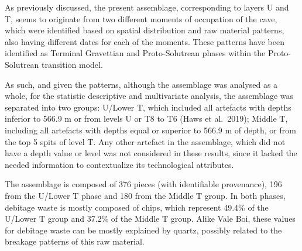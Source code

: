 \documentclass[12pt,twoside]{reedthesis}
\begin{document}
As previously discussed, the present assemblage, corresponding to layers U and T, seems to originate from two different moments of occupation of the cave, which were identified based on spatial distribution and raw material patterns, also having different dates for each of the moments. These patterns have been identified as Terminal Gravettian and Proto-Solutrean phases within the Proto-Solutrean transition model.

As such, and given the patterns, although the assemblage was analysed as a whole, for the statistic descriptive and multivariate analysis, the assemblage was separated into two groups: U/Lower T, which included all artefacts with depths inferior to 566.9 m or from levels U or T8 to T6 (Haws et al.~2019); Middle T, including all artefacts with depths equal or superior to 566.9 m of depth, or from the top 5 spits of level T. Any other artefact in the assemblage, which did not have a depth value or level was not considered in these results, since it lacked the needed information to contextualize its technological attributes.

The assemblage is composed of 376 pieces (with identifiable provenance), 196 from the U/Lower T phase and 180 from the Middle T group. In both phases, debitage waste is mostly composed of chips, which represent 49.4\% of the U/Lower T group and 37.2\% of the Middle T group. Alike Vale Boi, these values for debitage waste can be mostly explained by quartz, possibly related to the breakage patterns of this raw material.
\end{document}
